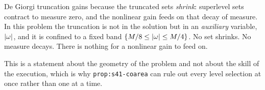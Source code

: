 \begin{obsv}
\label{obs:degiorgi}
De Giorgi truncation gains because the truncated sets \emph{shrink}: superlevel
sets contract to measure zero, and the nonlinear gain feeds on that decay of
measure. In this problem the truncation is not in the solution but in an
\emph{auxiliary} variable, \(\left|\omega\right|\), and it is confined to a fixed band
\(\{M/8\le\left|\omega\right|\le M/4\}\). No set shrinks. No measure decays. There is
nothing for a nonlinear gain to feed on.

\smallskip
This is a statement about the geometry of the problem and not about the
skill of the execution, which is why \texttt{prop:s41-coarea} can rule out
every level selection at once rather than one at a time.
\end{obsv}

